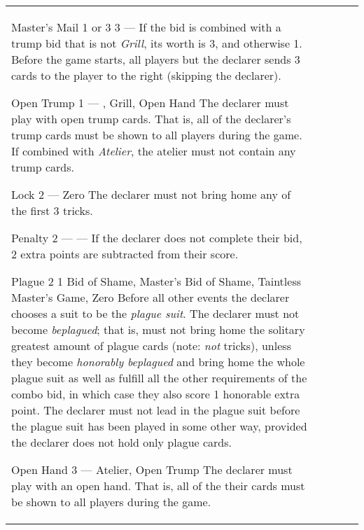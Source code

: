 \begin{center}
\begin{tabularx}{\textwidth}{
			l
			S[table-number-alignment=center, table-format=1.0]
			S[table-number-alignment=center, table-format=1.0]
			p{3cm}
			|X
		}
			\specialBidItem%
			{Master's Mail}
			{{1 or 3}}
			{3}
			{---}
			{%
				If the bid is combined with a trump bid that is not \emph{Grill}, its worth is 3, and otherwise 1. Before the game starts, all players but the declarer sends 3 cards to the player to the right (skipping the declarer).
			}

			\specialBidItem%
			{Open Trump}
			{1}
			{{---}}
			{\nonTrump, Grill, Open Hand}
			{%
				The declarer must play with open trump cards. That is, all of the declarer’s trump cards must be shown to all players during the game. If combined with \emph{Atelier}, the atelier must not contain any trump cards.
			}

			\specialBidItem%
			{Lock}
			{2}
			{{---}}
			{Zero}
			{%
				The declarer must not bring home any of the first 3 tricks.
			}

			\specialBidItem%
			{Penalty}
			{2}
			{{---}}
			{---}
			{%
				If the declarer does not complete their bid, 2 extra points are subtracted from their score.
			}

			\specialBidItem%
			{Plague}
			{2}
			{1}
			{Bid of Shame, Master's Bid of Shame, Taintless Master's Game, Zero}
			{%
				Before all other events the declarer chooses a suit to be the \emph{plague suit}. The declarer must not become \emph{beplagued}; that is, must not bring home the solitary greatest amount of plague cards (note: \emph{not} tricks), unless they become \emph{honorably beplagued} and bring home the whole plague suit as well as fulfill all the other requirements of the combo bid, in which case they also score 1 honorable extra point. The declarer must not lead in the plague suit before the plague suit has been played in some other way, provided the declarer does not hold only plague cards.
			}

			\specialBidItem%
			{Open Hand}
			{3}
			{{---}}
			{Atelier, Open Trump}
			{%
				The declarer must play with an open hand. That is, all of the their cards must be shown to all players during the game.
			}
		\end{tabularx}
	\end{center}
